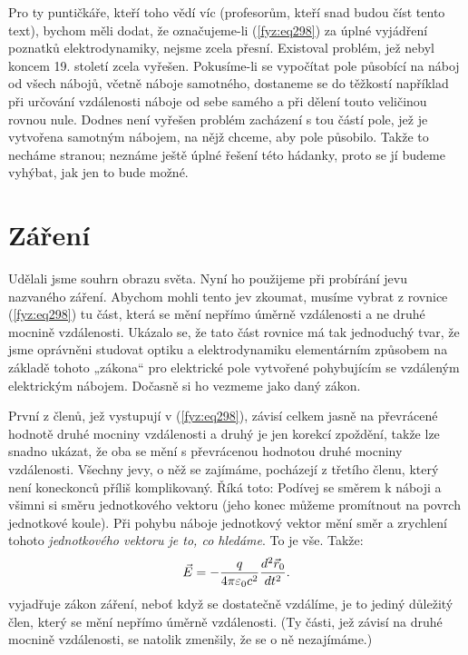 {    Pro ty puntičkáře, kteří toho vědí víc (profesorům, kteří snad budou číst tento text), bychom 
    měli dodat, že označujeme-li (\ref{fyz:eq298}) za úplné vyjádření poznatků elektrodynamiky, 
    nejsme zcela přesní. Existoval problém, jež nebyl koncem 19. století zcela vyřešen. Pokusíme-li 
    se vypočítat pole působící na náboj od všech nábojů, včetně náboje samotného, dostaneme se do 
    těžkostí například při určování vzdálenosti náboje od sebe samého a při dělení touto veličinou 
    rovnou nule. Dodnes není vyřešen problém zacházení s tou částí pole, jež je vytvořena samotným 
    nábojem, na nějž chceme, aby pole působilo. Takže to necháme stranou; neznáme ještě úplné 
    řešení této hádanky, proto se jí budeme vyhýbat, jak jen to bude možné.
    
  \section{Záření}\label{fyz:IchapXXVIIIsecII}
    Udělali jsme souhrn obrazu světa. Nyní ho použijeme při probírání jevu nazvaného záření. 
    Abychom mohli tento jev zkoumat, musíme vybrat z rovnice (\ref{fyz:eq298}) tu část, která se 
    mění nepřímo úměrně vzdálenosti a ne druhé mocnině vzdálenosti. Ukázalo se, že tato část 
    rovnice má tak jednoduchý tvar, že jsme oprávněni studovat optiku a elektrodynamiku 
    elementárním způsobem na základě tohoto „zákona“ pro elektrické pole vytvořené pohybujícím se 
    vzdáleným elektrickým nábojem. Dočasně si ho vezmeme jako daný zákon.
   
    První z členů, jež vystupují v (\ref{fyz:eq298}), závisí celkem jasně na převrácené hodnotě 
    druhé mocniny vzdálenosti a druhý je jen korekcí zpoždění, takže lze snadno ukázat, že oba se 
    mění s převrácenou hodnotou druhé mocniny vzdálenosti. Všechny jevy, o něž se zajímáme, 
    pocházejí z třetího členu, který není koneckonců příliš komplikovaný. Říká toto: Podívej se 
    směrem k náboji a všimni si směru jednotkového vektoru (jeho konec můžeme promítnout na povrch 
    jednotkové koule). Při pohybu náboje jednotkový vektor mění směr a zrychlení tohoto 
    \emph{jednotkového vektoru je to, co hledáme}. To je vše. Takže:
    \begin{equation}\label{fyz:eq300}
      \vec{E} = -\frac{q}{4\pi\varepsilon_0c^2}\frac{d^2 \vec{r}_0}{d t^2}.
    \end{equation}
    vyjadřuje zákon záření, neboť když se dostatečně vzdálíme, je to jediný důležitý člen, který se 
    mění nepřímo úměrně vzdálenosti. (Ty části, jež závisí na druhé mocnině vzdálenosti, se natolik 
    zmenšily, že se o ně nezajímáme.) 
    
}
